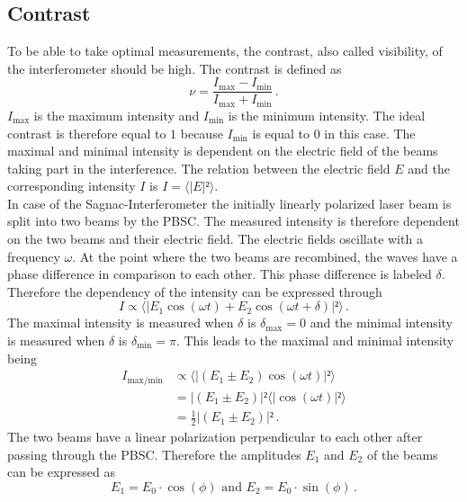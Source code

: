  \subsection{Contrast}
  To be able to take optimal measurements, the contrast, also called visibility, of the interferometer should be high. The contrast is defined
   as 
  \begin{equation}
    \nu = \frac{I_{\text{max}}- I_{\text{min}}}{I_{\text{max}}+ I_{\text{min}}}\, .
    \label{eqn:contrast}
  \end{equation}
 $I_{\text{max}}$ is the maximum intensity and $I_{\text{min}}$ is the minimum intensity. The ideal contrast is therefore equal to $1$ because
 $I_{\text{min}}$ is equal to $0$ in this case. The maximal and minimal intensity is dependent on the electric field of the beams taking 
 part in the interference. The relation between the electric field $E$ and the corresponding intensity $I$ is $I = \langle |E|² \rangle$. \\
 In case of the Sagnac-Interferometer the initially linearly polarized laser beam is split into two beams by the PBSC. The measured 
 intensity is therefore dependent on the two beams and their electric field. The electric fields oscillate with a frequency $\omega$. 
 At the point where the two beams are recombined, the waves have a phase difference in comparison to each other. This phase difference
 is labeled $\delta$. Therefore the dependency of the intensity can be expressed through
 \begin{equation*}
    I \propto \langle |E_1 \cos(\omega t) + E_2 \cos(\omega t + \delta)|²\rangle \, .
 \end{equation*}
 The maximal intensity is measured when $\delta$ is $\delta_{\text{max}} = 0$ and the minimal intensity is
 measured when $\delta$ is $\delta_{\text{min}} = \pi$. 
 This leads to the maximal and minimal intensity being 
 \begin{align*}
    I_{\text{max/min}} &\propto \langle |(E_1 \pm E_2) \cos(\omega t)|²\rangle \\
    &= |(E_1 \pm E_2)|² \langle |\cos(\omega t)|²\rangle \\
    &= \frac{1}{2} |(E_1 \pm E_2)|² \, .
 \end{align*}
 The two beams have a linear polarization perpendicular to each other after passing through the PBSC. 
 Therefore the amplitudes $E_1$ and $E_2$ of the beams can be expressed as 
 \begin{equation}
    E_1 = E_0 \cdot \cos(\phi) \,\, \text{and} \,\, E_2 = E_0 \cdot \sin(\phi) \, .
    \label{eqn:E_Felder}
 \end{equation}
